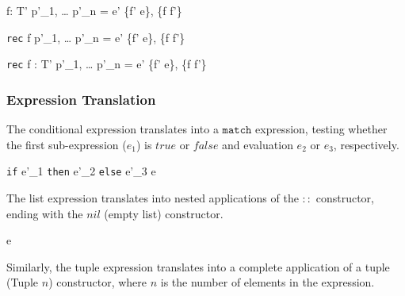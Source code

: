 \documentclass[class=article, crop=false]{standalone}
\begin{document}
  {\gamma \vdash f: T' \; p'_1, \; \dots \; p'_n = e' \Rightarrow \{f' \rightarrow e\}, \gamma \cup \{f \rightarrow f'\}}

  {\gamma \vdash \texttt{rec} \; f \; p'_1, \; \dots \; p'_n = e' \Rightarrow \{f' \rightarrow e\}, \gamma \cup \{f \rightarrow f'\}}

  {\gamma \vdash \texttt{rec} \; f : T' \; p'_1, \; \dots \; p'_n = e' \Rightarrow \{f' \rightarrow e\}, \gamma \cup \{f \rightarrow f'\}}

\subsubsection{Expression Translation}

The conditional expression translates into a $\texttt{match}$ expression, testing whether the first sub-expression ($e_1$) is $true$ or $false$ and evaluation $e_2$ or $e_3$, respectively.

  {\gamma \vdash \texttt{if} \; e'_1\; \texttt{then} \; e'_2 \; \texttt{else} \; e'_3 \Rightarrow e}

\bigskip

The list expression translates into nested applications of the $::$ constructor, ending with the $nil$ (empty list) constructor.

  {\gamma \vdash [e_1', \; \dots \; e_n'] \Rightarrow e}

\bigskip

Similarly, the tuple expression translates into a complete application of a tuple (Tuple $n$) constructor, where $n$ is the number of elements in the expression.
\end{document}
